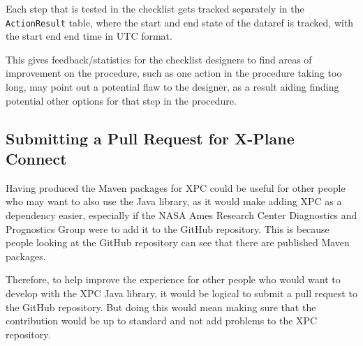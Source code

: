 \documentclass[../dissertation.tex]{subfiles}
\begin{document}
Each step that is tested in the checklist gets tracked separately in
the \lstinline|ActionResult| table, where the start and end state of the dataref
is tracked, with the start end end time in UTC format.

This gives feedback/statistics for the checklist designers to find
areas of improvement on the procedure, such as one action in the
procedure taking too long, may point out a potential flaw to the designer,
as a result aiding finding potential other options for that step in the procedure.

\subsection{Submitting a Pull Request for X-Plane Connect}

Having produced the Maven packages for XPC could be useful for other people who may want
to also use the Java library, as it would make adding XPC as a dependency easier, especially
if the NASA Ames Research Center Diagnostics and Prognostics Group were to add it to the
GitHub repository. This is because people looking at the GitHub repository can see that there
are published Maven packages.

Therefore, to help improve the experience for other people who would want to
develop with the XPC Java library, it would be logical to submit a pull request to the
GitHub repository. But doing this would mean making sure that the contribution would be up
to standard and not add problems to the XPC repository.
\end{document}
